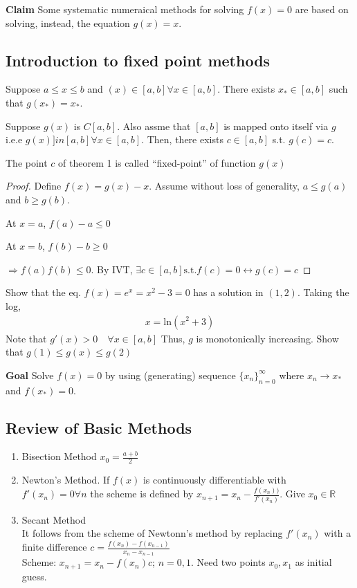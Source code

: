 \textbf{Claim} Some systematic numeraical methods for solving $f(x)=0$ are based on solving, instead, the equation $g(x)=x$.

\subsection{Introduction to fixed point methods}
Suppose $a\leq x\leq b$ and $(x)\in[a,b] \forall x \in [a,b]$. There exists $x_*\in[a,b]$ such that $g(x_*) =x_*$.

\begin{theorem} 
   Suppose $g(x)$ is $C[a,b]$. Also assme that $[a,b]$ is mapped onto itself via $g$ i.e.e $g(x)]in[a,b] \forall x \in[a,b]$. Then, there exists $c\in[a,b]$ s.t. $g(c)=c$.
\end{theorem}

\begin{definition} 
    The point $c$ of theorem 1 is called ``fixed-point'' of function $g(x)$ 
\end{definition}

\begin{proof} 
    Define $f(x) = g(x) - x$. Assume without loss of generality, $a \leq g(a)$  and $b \geq g(b)$.

    At $x=a$, $f(a) -a \leq 0$

    At $x=b$, $f(b) -b \geq 0$

    $\Rightarrow f(a)f(b)\leq 0$. By IVT, $\exists c\in[a,b] \mathrm{s.t.} f(c)=0 \leftrightarrow g(c) = c$
\end{proof}

\begin{example} 
   Show that the eq. $f(x)=e^x =x^2 -3=0$ has a solution in $(1,2)$. Taking the log,
   \begin{align*} 
       x = \mathrm{ln}(x^2+3)
   \end{align*}
   Note that $g'(x) > 0 \quad \forall x\in [a,b]$
   Thus, $g$ is monotonically increasing. Show that $g(1)\leq g(x) \leq g(2)$
\end{example}

\textbf{Goal} Solve $f(x)=0$ by using (generating) sequence $\{x_n\}_{n=0}^\infty$ where $x_n \rightarrow x_*$ and $f(x_*)=0$.

\subsection{Review of Basic Methods}
\begin{enumerate} 
    \item Bisection Method $x_0 = \frac{a+b}{2}$
    \item Newton's Method. If $f(x)$ is continuously differentiable with $f'(x_n)=0 \forall n$ the scheme is defined by $x_{n+1} = x_n-\frac{f(x_n))}{f'(x_n)}$. Give $x_0\in \mathbb{R}$
    \item Secant Method \\ It follows from the scheme of Newtonn's method by replacing $f'(x_n)$ with a finite difference $c = \frac{f(x_n) - f(x_{n-1})}{x_n - x_{n-1}}$ \\ Scheme: $x_{n+1} = x_n - f(x_n)c$; $n=0,1$. Need two points $x_0,x_1$ as initial guess.
\end{enumerate}

